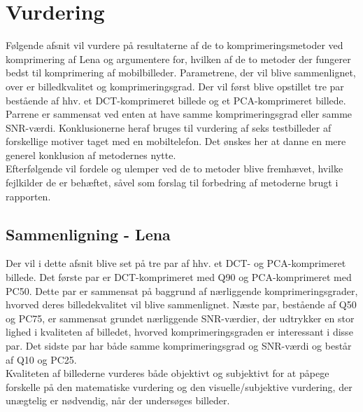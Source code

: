 \chapter{Vurdering} \label{sec:vurdering}
Følgende afsnit vil vurdere på resultaterne af de to komprimeringsmetoder ved komprimering af Lena og argumentere for, hvilken af de to metoder der fungerer bedst til komprimering af mobilbilleder. Parametrene, der vil blive sammenlignet, over er billedkvalitet og komprimeringsgrad. Der vil først blive opstillet tre par bestående af hhv. et DCT-komprimeret billede og et PCA-komprimeret billede. Parrene er sammensat ved enten at have samme komprimeringsgrad eller samme SNR-værdi. Konklusionerne heraf bruges til vurdering af seks testbilleder af forskellige motiver taget med en mobiltelefon. Det ønskes her at danne en mere generel konklusion af metodernes nytte.\\
Efterfølgende vil fordele og ulemper ved de to metoder blive fremhævet, hvilke fejlkilder de er behæftet, såvel som forslag til forbedring af metoderne brugt i rapporten.

\section{Sammenligning - Lena}
Der vil i dette afsnit blive set på tre par af hhv. et DCT- og PCA-komprimeret billede. Det første par er DCT-komprimeret med Q90 og PCA-komprimeret med PC50. Dette par er sammensat på baggrund af nærliggende komprimeringsgrader, hvorved deres billedekvalitet vil blive sammenlignet. Næste par, bestående af Q50 og PC75, er sammensat grundet nærliggende SNR-værdier, der udtrykker en stor lighed i kvaliteten af billedet, hvorved komprimeringsgraden er interessant i disse par. Det sidste par har både samme komprimeringsgrad og SNR-værdi og består af Q10 og PC25.\\
Kvaliteten af billederne vurderes både objektivt og subjektivt for at påpege forskelle på den matematiske vurdering og den visuelle/subjektive vurdering, der unægtelig er nødvendig, når der undersøges billeder.

